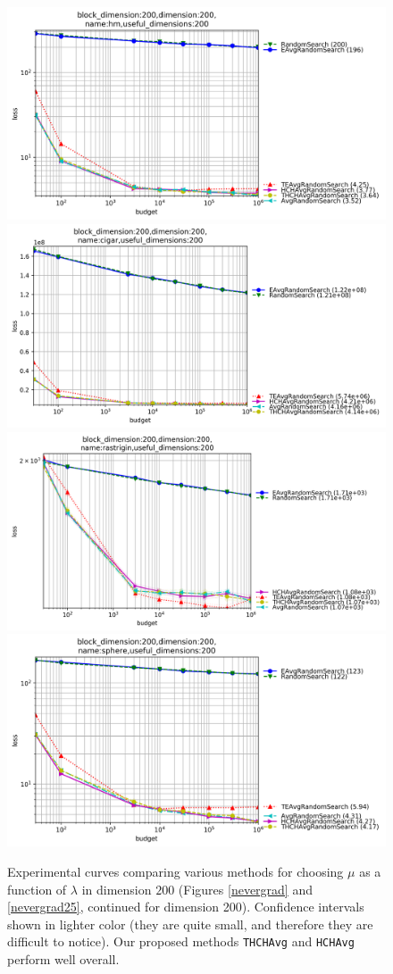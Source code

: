 \begin{figure}[t]
\centering
\includegraphics[trim={0 0 0 20}, clip, width=.48\textwidth]{sections/appendix/ppsn2020-kbest/imgs/hugewidedoenonw/xpresults_block_dimension200,dimension200,namehm,useful_dimensions200.png}
\includegraphics[trim={0 0 0 20}, clip, width=.48\textwidth]{sections/appendix/ppsn2020-kbest/imgs/hugewidedoenonw/xpresults_block_dimension200,dimension200,namecigar,useful_dimensions200.png}
\includegraphics[trim={0 0 0 20}, clip, width=.48\textwidth]{sections/appendix/ppsn2020-kbest/imgs/hugewidedoenonw/xpresults_block_dimension200,dimension200,namerastrigin,useful_dimensions200.png}
\includegraphics[trim={0 0 0 20}, clip, width=.48\textwidth]{sections/appendix/ppsn2020-kbest/imgs/hugewidedoenonw/xpresults_block_dimension200,dimension200,namesphere,useful_dimensions200.png}\caption{\label{nevergrad200}Experimental curves comparing various methods for choosing $\mu$ as a function of $\lambda$ in dimension $200$ (Figures \ref{nevergrad} and \ref{nevergrad25}, continued for dimension 200). Confidence intervals shown in lighter color (they are quite small, and therefore they are difficult to notice). Our proposed methods \texttt{THCHAvg} and \texttt{HCHAvg} perform well overall.}
\end{figure}
